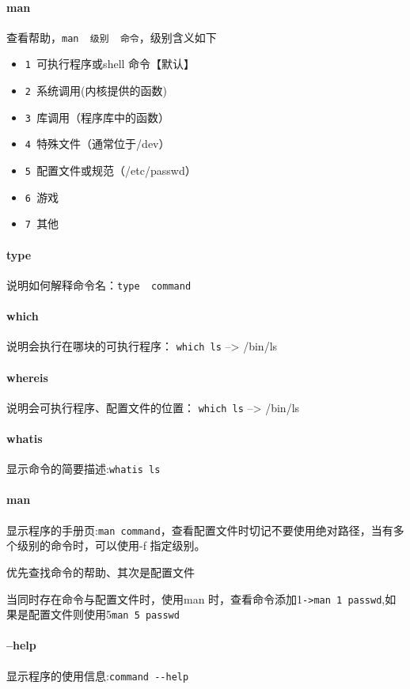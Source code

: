 \documentclass[UTF8,a4paper,12pt]{ctexbook}
\begin{document}
		\paragraph{man} 查看帮助，\verb|man  级别  命令|，级别含义如下
			\begin{itemize}
				\item \verb|1 |可执行程序或shell 命令【默认】
				\item \verb|2 |系统调用(内核提供的函数)
				\item \verb|3 |库调用（程序库中的函数）
				\item \verb|4 |特殊文件（通常位于/dev）
				\item \verb|5 |配置文件或规范（/etc/passwd）
				\item \verb|6 |游戏
				\item \verb|7 |其他
			\end{itemize}
		\paragraph{type} 说明如何解释命令名：\verb|type  command|
		
		\paragraph{which} 说明会执行在哪块的可执行程序： \verb|which ls| --> /bin/ls
		
		\paragraph{whereis} 说明会可执行程序、配置文件的位置： \verb|which ls| --> /bin/ls
		
		\paragraph{whatis} 显示命令的简要描述:\verb|whatis ls|
		
		\paragraph{man} 显示程序的手册页:\verb|man command|，查看配置文件时切记不要使用绝对路径，当有多个级别的命令时，可以使用-f 指定级别。
		
			
			优先查找命令的帮助、其次是配置文件
			
			当同时存在命令与配置文件时，使用man 时，查看命令添加1\verb|->man 1 passwd|,如果是配置文件则使用5\verb|man 5 passwd|
			
		\paragraph{--help} 显示程序的使用信息:\verb|command --help|
		
\end{document}
